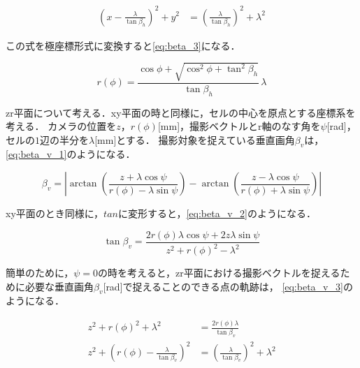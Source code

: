 \documentclass[autodetect-engine,dvipdfmx-if-dvi,ja=standard,a4j,jbase=11pt,magstyle=nomag*]{bxjsreport}
\begin{document}
\begin{equation}
    \begin{aligned}
    \left(  x - \frac{\lambda}{\tan \beta_{h}}  \right) ^2 + y^2 & = \left( \frac{\lambda}{\tan \beta_{h}} \right) ^2 + \lambda^2
    \end{aligned}
\label{eq:beta_h_2}
\end{equation}

この式を極座標形式に変換すると\cref{eq:beta_3}になる．

\begin{equation}
r(\phi)=\frac{\cos \phi+\sqrt{\cos^{2}\phi+\tan^{2}\beta_{h}}}{\tan \beta_{h}}\, \lambda
\label{eq:beta_h_3}
\end{equation}

zr平面について考える．xy平面の時と同様に，セルの中心を原点とする座標系を考える．
カメラの位置を$z$，$r(\phi)$[mm]，撮影ベクトルとr軸のなす角を$\psi$[rad]，
セルの$1$辺の半分を$\lambda$[mm]とする．
撮影対象を捉えている垂直画角$\beta_{v}$は，\cref{eq:beta_v_1}のようになる．

\begin{equation}
\beta_{v}=\left|\arctan \left(\frac{z+\lambda \cos \psi}{r(\phi)-\lambda \sin \psi}\right)-
               \arctan \left(\frac{z-\lambda \cos \psi}{r(\phi)+\lambda \sin \psi}\right)\right|
\label{eq:beta_v_1}
\end{equation}

xy平面のとき同様に，$tan$に変形すると，\cref{eq:beta_v_2}のようになる．


\begin{equation}
\tan \beta_{v}=\frac{2r(\phi)\lambda \cos \psi + 2z\lambda \sin \psi}{z^2 + r(\phi)^2 - \lambda^2}
\label{eq:beta_v_2}
\end{equation}

簡単のために，$\psi = 0$の時を考えると，zr平面における撮影ベクトルを捉えるために必要な垂直画角$\beta_{v}$[rad]で捉えることのできる点の軌跡は，
\cref{eq:beta_v_3}のようになる．

\begin{equation}
    \begin{aligned}
    z^2 + r(\phi)^2 + \lambda^2 & = \frac{2r(\phi) \lambda}{\tan \beta_{v}} \\ 
    z^2 + \left(  r(\phi) - \frac{\lambda}{\tan \beta_{v}}  \right) ^2  & = \left( \frac{\lambda}{\tan \beta_{v}} \right) ^2 + \lambda^2
    \end{aligned}
\label{eq:beta_v_3}
\end{equation}
\end{document}
